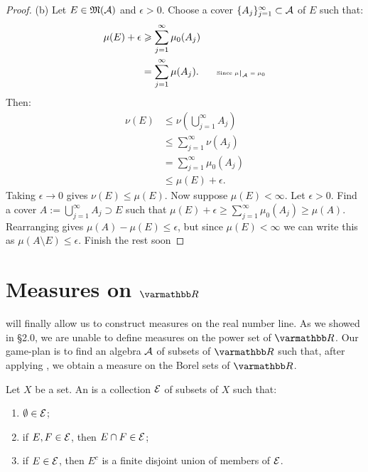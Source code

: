 \begin{proof}
            (b) Let $E \in \mathfrak{M}(\mathcal{A})$ and $\epsilon > 0$. Choose a cover $\{A_j\}_{j = 1}^\infty \subset \mathcal{A}$ of $E$ such that:
                \begin{equation*}
                \begin{split}
                    \mu(E) + \epsilon 
                    & \geq \sum_{j = 1}^\infty \mu_0(A_j) \\
                    & = \sum_{j = 1}^\infty \mu(A_j). \h9\h9\text{\tiny Since $\restr{\mu}{\cA} = \mu_0$}
                \end{split}
                \end{equation*}
            Then:
                \begin{equation*}
                \begin{split}
                    \nu(E)
                    & \leq \nu\left(\bigcup_{j = 1}^\infty A_j\right) \\ 
                    & \leq \sum_{j = 1}^\infty \nu(A_j) \\
                    & = \sum_{j = 1}^\infty \mu_0(A_j)\\
                    & \leq \mu(E) + \epsilon.
                \end{split}
                \end{equation*}
            Taking $\epsilon \rightarrow 0$ gives $\nu(E) \leq \mu(E)$. Now suppose $\mu(E) < \infty$. Let $\epsilon > 0$. Find a cover  $A := \bigcup_{j = 1}^\infty A_j \supset E$ such that $\mu(E) + \epsilon \geq \sum_{j = 1}^\infty \mu_0(A_j) \geq \mu(A)$. Rearranging gives $\mu(A) - \mu(E) \leq \epsilon$, but since $\mu(E) < \infty$ we can write this as $\mu(A \setminus E) \leq \epsilon$. {\color{red} Finish the rest soon}
        \end{proof}

\section{Measures on $\bfR$}

 will finally allow us to construct measures on the real number line. As we showed in \S 2.0, we are unable to define measures on the power set of $\bfR$. Our game-plan is to find an algebra $\mathcal{A}$ of subsets of $\bfR$ such that, after applying , we obtain a measure on the Borel sets of $\bfR$.

    \begin{definition}
        Let $X$ be a set. An  is a collection $\mathcal{E}$ of subsets of $X$ such that:
            \begin{enumerate}[label = (\arabic*),itemsep=1pt,topsep=3pt]
                \item $\emptyset \in \mathcal{E}$;
                \item if $E,F \in \mathcal{E}$, then $E \cap F \in \mathcal{E}$;
                \item if $E \in \mathcal{E}$, then $E^c$ is a finite disjoint union of members of $\mathcal{E}$.
            \end{enumerate}
    \end{definition}


